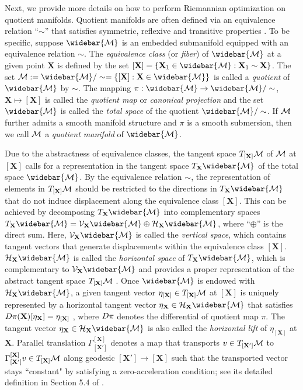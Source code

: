 \documentclass[11pt]{article}
\newcommand{\cV}{\mathcal{V}}
\newcommand{\cH}{\mathcal{H}}
\newcommand{\0}{{\mathbf{0}}}
\newcommand{\1}{{\mathbf{1}}}
\newcommand{\X}{{\mathbf{X}}}
\newcommand{\cM}{{\cal M}}
\begin{document}
Next, we provide more details on how to perform Riemannian optimization on quotient manifolds. Quotient manifolds are often defined via an equivalence relation ``$\sim$'' that satisfies symmetric, reflexive and transitive properties \cite[Section 3.4.1]{absil2009optimization}. To be specific, suppose $\widebar{\cM}$ is an embedded submanifold equipped with an equivalence relation $\sim$. The {\it equivalence class} (or {\it fiber}) of $\widebar{\cM}$ at a given point $\X$ is defined by the set $[\X] = \{\X_1 \in \widebar{\cM}: \X_1 \sim \X \}$. The set $ \cM := \widebar{\cM}/\sim = \{[\X]: \X \in \widebar{\cM} \}$ is called a {\it quotient} of $\widebar{\cM}$ by $\sim$. The mapping $\pi: \widebar{\cM} \to \widebar{\cM}/\sim$, $ \X \mapsto [\X]$ is called the {\it quotient map} or {\it canonical projection} and the set $\widebar{\cM}$ is called the {\it total space} of the quotient $\widebar{\cM}/\sim$. If $\cM$ further admits a smooth manifold structure and $\pi$ is a smooth submersion, then we call $\cM$ a {\it quotient manifold} of $\widebar{\cM}$. 

Due to the abstractness of equivalence classes, the tangent space $T_{[\X]} \cM$ of $\cM$ at $[\X]$ calls for a representation in the tangent space $T_{\X}\widebar{\cM}$ of the total space $\widebar{\cM}$. By the equivalence relation $\sim$, the representation of elements in $T_{[\X]} \cM$ should be restricted to the directions in $T_\X \widebar{\cM}$ that do not induce displacement along the equivalence class $[\X]$. This can be achieved by decomposing $T_{\X}\widebar{\cM}$ into complementary spaces $T_{\X}\widebar{\cM} = \cV_{\X} \widebar{\cM} \oplus \cH_{\X} \widebar{\cM}$, where ``$\oplus$'' is the direct sum. Here, $\cV_{\X} \widebar{\cM}$ is called the {\it vertical space}, which contains {tangent vectors that generate displacements within the equivalence class $[\X]$}. $\cH_{\X} \widebar{\cM}$ is called the {\it horizontal space} of $T_{\X}\widebar{\cM}$, which is complementary to $\cV_\X \widebar{\cM}$ and provides a proper representation of the abstract tangent space $T_{[\X]} \cM$ \cite[Section 3.5.8]{absil2009optimization}. Once $\widebar{\cM}$ is endowed with $\cH_{\X}\widebar{\cM}$, a given tangent vector $\eta_{[\X]} \in T_{[\X]} \cM$ at $[\X]$ is uniquely represented by a horizontal tangent vector $\eta_\X \in \cH_\X \widebar{\cM}$ that satisfies ${\rm D} \pi (\X)[\eta_\X] = \eta_{[\X]}$ \cite[Section 3.5.8]{absil2009optimization}, {where ${\rm D} \pi$ denotes the differential of quotient map $\pi$}. The tangent vector $\eta_\X \in \cH_\X \widebar{\cM}$ is also called the {\it horizontal lift} of $\eta_{[\X]}$ at $\X$. {Parallel translation $\Gamma_{[\X']}^{[\X]}$ denotes a map that transports $v \in T_{[\X']} \cM$ to $ \Gamma_{[\X']}^{[\X]} v \in T_{[\X]} \cM$ along geodesic $[\X'] \to [\X]$ such that the transported vector stays ``constant" by satisfying a zero-acceleration condition; see its detailed definition in Section 5.4 of \cite{absil2009optimization}.}
\end{document}
